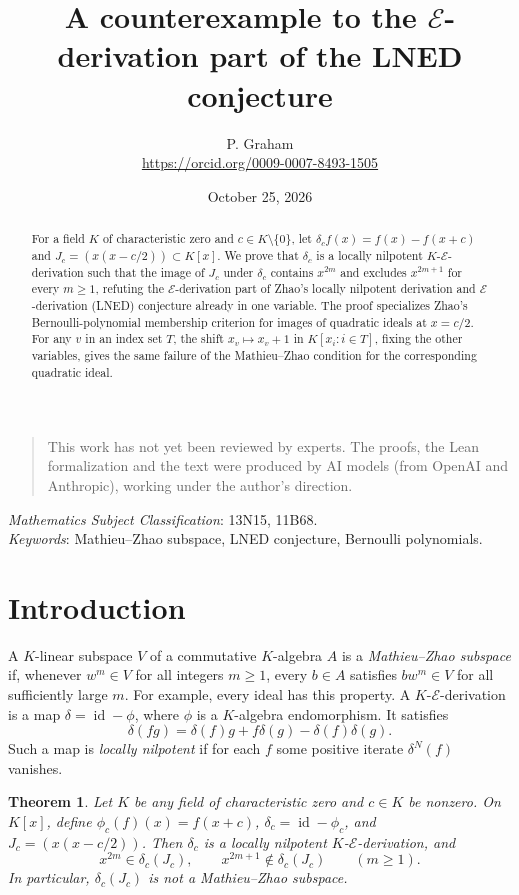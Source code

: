 \documentclass[11pt]{article}
\title{A counterexample to the $\mathcal{E}$-derivation part of the LNED conjecture}
\author{P. Graham\\ \small\url{https://orcid.org/0009-0007-8493-1505}}
\date{October 25, 2026}
\newtheorem{theorem}{Theorem}
\newcommand{\E}{\mathcal{E}}
\begin{document}
\maketitle
\begin{abstract}
For a field $K$ of characteristic zero and $c\in K\setminus\{0\}$, let
$\delta_c f(x)=f(x)-f(x+c)$ and $J_c=(x(x-c/2))\subset K[x]$.
We prove that $\delta_c$ is a locally nilpotent $K$-$\E$-derivation
such that the image of $J_c$ under $\delta_c$ contains $x^{2m}$ and excludes $x^{2m+1}$ for every
$m\ge1$, refuting the $\E$-derivation part of Zhao's locally nilpotent
derivation and $\E$-derivation (LNED) conjecture already in one variable.
The proof specializes Zhao's Bernoulli-polynomial membership criterion
for images of quadratic ideals at $x=c/2$.
For any $v$ in an index set $T$, the shift $x_v\mapsto x_v+1$ in
$K[x_i:i\in T]$, fixing the other variables, gives the same
failure of the Mathieu--Zhao condition for the corresponding quadratic ideal.
\end{abstract}

\begin{quotation}\small\noindent
This work has not yet been reviewed by experts.
The proofs, the Lean formalization and the text were produced by AI models
(from OpenAI and Anthropic), working under the author's direction.
\end{quotation}

 \emph{Mathematics Subject Classification}: 13N15, 11B68.\\
\emph{Keywords}: Mathieu--Zhao subspace, LNED conjecture, Bernoulli polynomials.

\section{Introduction}

A $K$-linear subspace $V$ of a commutative $K$-algebra $A$ is a
\emph{Mathieu--Zhao subspace} if, whenever $w^m\in V$ for all integers
$m\ge1$, every $b\in A$ satisfies $bw^m\in V$ for all sufficiently large
$m$. For example, every ideal has this property. A $K$-$\E$-derivation is a
map $\delta=\operatorname{id}-\phi$, where $\phi$ is a $K$-algebra
endomorphism. It satisfies
\[
 \delta(fg)=\delta(f)g+f\delta(g)-\delta(f)\delta(g).
\]
Such a map is \emph{locally nilpotent} if for each $f$ some positive
iterate $\delta^N(f)$ vanishes.

\begin{theorem}\label{thm:main}
Let $K$ be any field of characteristic zero and $c\in K$ be nonzero.
On $K[x]$, define $\phi_c(f)(x)=f(x+c)$,
$\delta_c=\operatorname{id}-\phi_c$, and $J_c=(x(x-c/2))$.
Then $\delta_c$ is a locally nilpotent $K$-$\E$-derivation, and
\[
 x^{2m}\in\delta_c(J_c),\qquad
 x^{2m+1}\not\in\delta_c(J_c)\qquad(m\ge1).
\]
In particular, $\delta_c(J_c)$ is not a Mathieu--Zhao subspace.
\end{theorem}
\end{document}
